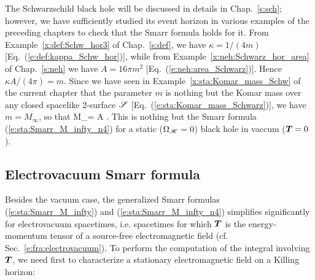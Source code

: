 \begin{example}
The Schwarzschild black hole will be discussed in details in Chap.~\ref{s:sch};
however, we have sufficiently studied its event horizon in various examples
of the preceding chapters to check that the Smarr formula holds
for it. From Example~\ref{x:def:Schw_hor3} of Chap.~\ref{s:def}, we have
$\kappa = 1/(4 m)$ [Eq.~(\ref{e:def:kappa_Schw_hor})], while from
Example~\ref{x:neh:Schwarz_hor_area} of Chap.~\ref{s:neh} we have
$A = 16\pi m^2$ [Eq.~(\ref{e:neh:area_Schwarz})]. Hence
$\kappa A / (4\pi) = m$. Since we have seen in Example~\ref{x:sta:Komar_mass_Schw}
of the current chapter that the parameter $m$ is nothing but the Komar mass
over any closed spacelike 2-surface $\mathscr{S}$ [Eq.~(\ref{e:sta:Komar_mass_Schwarz})],
we have $m = M_\infty$, so that
\be
    M_\infty = \frac{\kappa}{4\pi} A .
\ee
This is nothing but the Smarr formula (\ref{e:sta:Smarr_M_infty_n4})
for a static ($\Omega_{\mathscr{H}} = 0$) black hole in vaccum ($\bm{T}=0$).
\end{example}

\subsection{Electrovacuum Smarr formula} \label{s:sta:Smarr_electrovac}

Besides the vacuum case, the generalized Smarr formulas (\ref{e:sta:Smarr_M_infty})
and (\ref{e:sta:Smarr_M_infty_n4}) simplifies significantly for
electrovacuum spacetimes, i.e. spacetimes for which $\bm{T}$ is the energy-momentum
tensor of a source-free electromagnetic field (cf. Sec.~\ref{e:fra:electrovacuum}).
To perform the computation of the integral involving $\bm{T}$,
we need first to characterize a stationary electromagnetic field on
a Killing horizon:

